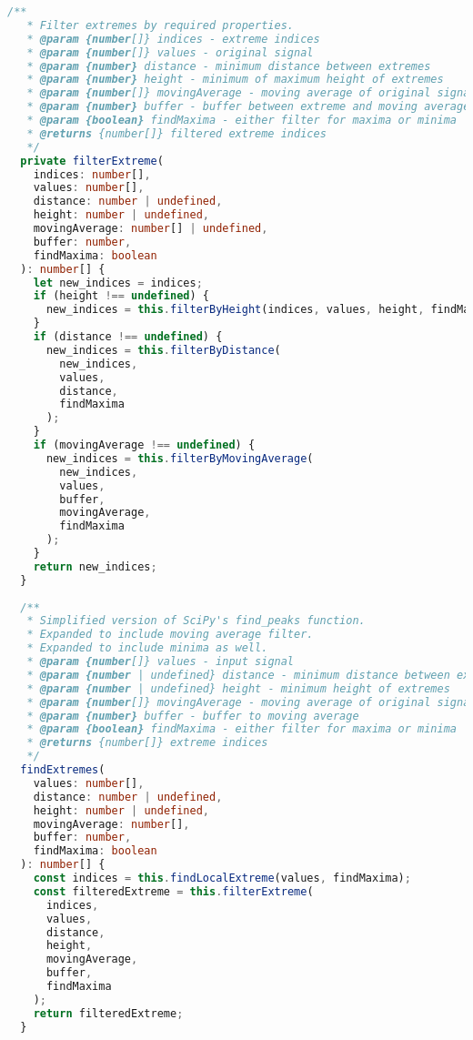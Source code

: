 \begin{lstlisting}[language=Typescript]
  /**
   * Filter extremes by required properties.
   * @param {number[]} indices - extreme indices
   * @param {number[]} values - original signal
   * @param {number} distance - minimum distance between extremes
   * @param {number} height - minimum of maximum height of extremes
   * @param {number[]} movingAverage - moving average of original signal
   * @param {number} buffer - buffer between extreme and moving average
   * @param {boolean} findMaxima - either filter for maxima or minima
   * @returns {number[]} filtered extreme indices
   */
  private filterExtreme(
    indices: number[],
    values: number[],
    distance: number | undefined,
    height: number | undefined,
    movingAverage: number[] | undefined,
    buffer: number,
    findMaxima: boolean
  ): number[] {
    let new_indices = indices;
    if (height !== undefined) {
      new_indices = this.filterByHeight(indices, values, height, findMaxima);
    }
    if (distance !== undefined) {
      new_indices = this.filterByDistance(
        new_indices,
        values,
        distance,
        findMaxima
      );
    }
    if (movingAverage !== undefined) {
      new_indices = this.filterByMovingAverage(
        new_indices,
        values,
        buffer,
        movingAverage,
        findMaxima
      );
    }
    return new_indices;
  }
  
  /**
   * Simplified version of SciPy's find_peaks function.
   * Expanded to include moving average filter.
   * Expanded to include minima as well.
   * @param {number[]} values - input signal
   * @param {number | undefined} distance - minimum distance between extremes
   * @param {number | undefined} height - minimum height of extremes
   * @param {number[]} movingAverage - moving average of original signal
   * @param {number} buffer - buffer to moving average
   * @param {boolean} findMaxima - either filter for maxima or minima
   * @returns {number[]} extreme indices
   */
  findExtremes(
    values: number[],
    distance: number | undefined,
    height: number | undefined,
    movingAverage: number[],
    buffer: number,
    findMaxima: boolean
  ): number[] {
    const indices = this.findLocalExtreme(values, findMaxima);
    const filteredExtreme = this.filterExtreme(
      indices,
      values,
      distance,
      height,
      movingAverage,
      buffer,
      findMaxima
    );
    return filteredExtreme;
  }


\end{lstlisting}
